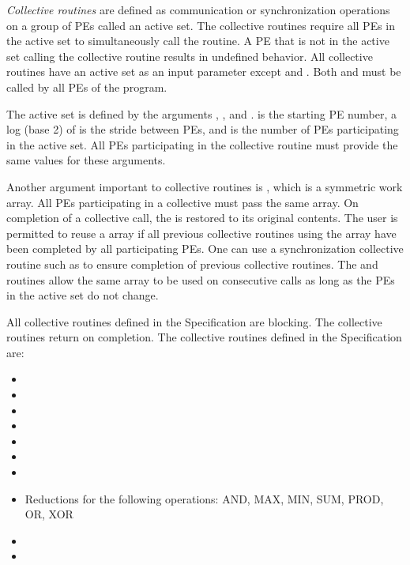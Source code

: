 \emph{Collective routines} are defined as communication or synchronization
operations on a group of \acp{PE} called an active set. The collective
routines require all \acp{PE} in the active set to simultaneously call the
routine.  A \ac{PE} that is not in the active set calling the collective
routine results in undefined behavior.  All collective routines have an
active set as an input parameter except  and .
Both  and  must be called by all \acp{PE} of the
\openshmem program. 

The active set is defined by the arguments , ,
and .   is the starting \ac{PE} number, a log (base
2) of  is the stride between \acp{PE}, and  is
the number of \acp{PE} participating in the active set.  All \acp{PE}
participating in the collective routine must provide the same values for these
arguments. 
 
Another argument important to collective routines is , which is a
symmetric work array.  All \acp{PE} participating in a collective must pass the
same  array.  On completion of a collective call, the  is
restored to its original contents.  The user is permitted to reuse a 
array if all previous collective routines using the  array have been
completed by all participating \acp{PE}.  One can use a synchronization
collective routine such as  to ensure completion of previous collective
routines. The  and  routines allow the same  array to
be used on consecutive calls as long as the \acp{PE} in the active set do not change. 

All collective routines defined in the Specification are blocking.  The
collective routines return on completion.  The collective routines defined in
the \openshmem Specification are:

\begin{itemize}
\item {}
\item {}
\item {}
\item {}
\item {}
\item {}
\item {}
\item Reductions for the following operations: AND, MAX, MIN, SUM, PROD, OR, XOR
\item {}
\item {}
\end{itemize}

